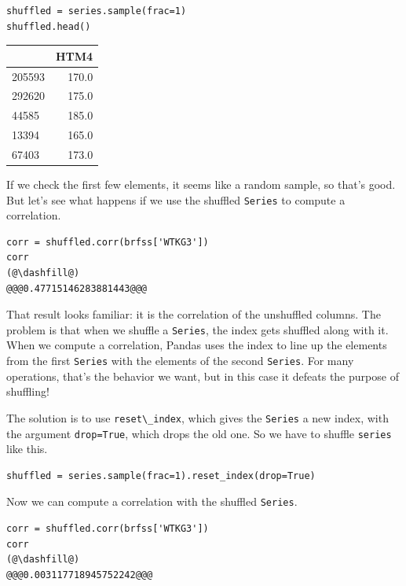 \begin{lstlisting}[]
shuffled = series.sample(frac=1)
shuffled.head()
\end{lstlisting}

\begin{tabular}{lr}
\midrule
{} &   HTM4 \\
\midrule
205593 &  170.0 \\
292620 &  175.0 \\
44585  &  185.0 \\
13394  &  165.0 \\
67403  &  173.0 \\
\midrule
\end{tabular}

If we check the first few elements, it seems like a random sample, so
that's good. But let's see what happens if we use the shuffled
\passthrough{\lstinline!Series!} to compute a correlation.

\begin{lstlisting}[]
corr = shuffled.corr(brfss['WTKG3'])
corr
(@\dashfill@)
@@@0.47715146283881443@@@
\end{lstlisting}

That result looks familiar: it is the correlation of the unshuffled
columns. The problem is that when we shuffle a
\passthrough{\lstinline!Series!}, the index gets shuffled along with it.
When we compute a correlation, Pandas uses the index to line up the
elements from the first \passthrough{\lstinline!Series!} with the
elements of the second \passthrough{\lstinline!Series!}. For many
operations, that's the behavior we want, but in this case it defeats the
purpose of shuffling!

The solution is to use \passthrough{\lstinline!reset\_index!}, which
gives the \passthrough{\lstinline!Series!} a new index, with the
argument \passthrough{\lstinline!drop=True!}, which drops the old one.
So we have to shuffle \passthrough{\lstinline!series!} like this.

\begin{lstlisting}[]
shuffled = series.sample(frac=1).reset_index(drop=True)
\end{lstlisting}

Now we can compute a correlation with the shuffled
\passthrough{\lstinline!Series!}.

\begin{lstlisting}[]
corr = shuffled.corr(brfss['WTKG3'])
corr
(@\dashfill@)
@@@0.003117718945752242@@@
\end{lstlisting}

